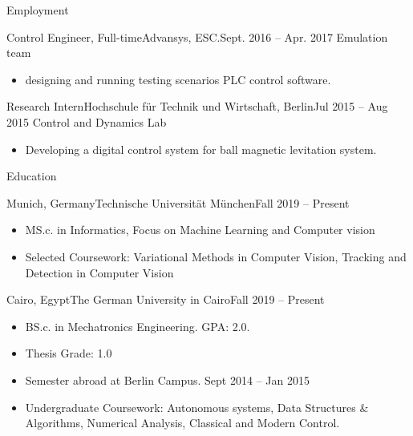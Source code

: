 \documentclass[]{mcdowellcv}
\begin{document}
\begin{cvsection}{Employment}
		\begin{cvsubsection}{Control Engineer, Full-time}{Advansys, ESC.}{Sept. 2016 -- Apr. 2017}
			Emulation team
			\begin{itemize}
				\item designing and running testing scenarios PLC control software.
			\end{itemize}
		\end{cvsubsection}
		
		\begin{cvsubsection}{Research Intern}{Hochschule für Technik und Wirtschaft, Berlin}{Jul 2015 -- Aug 2015}
			Control and Dynamics Lab		
			\begin{itemize}
				\item Developing a digital control system for ball magnetic levitation system.
			\end{itemize}
		\end{cvsubsection}
		
	\end{cvsection}
	
	\begin{cvsection}{Education}
		\begin{cvsubsection}{Munich, Germany}{Technische Universität München}{Fall 2019 -- Present}
			\begin{itemize}
				\item MS.c. in Informatics, Focus on Machine Learning and Computer vision
				\item Selected Coursework: Variational Methods in Computer Vision, Tracking and Detection in Computer Vision
			\end{itemize}
		\end{cvsubsection}
		\begin{cvsubsection}{Cairo, Egypt}{The German University in Cairo}{Fall 2019 -- Present}
			\begin{itemize}
				\item BS.c. in Mechatronics Engineering. GPA: 2.0.
				\item Thesis Grade: 1.0
				\item Semester abroad at Berlin Campus. Sept 2014 -- Jan 2015

				\item Undergraduate Coursework: Autonomous systems, Data Structures \& Algorithms, Numerical Analysis, Classical and Modern Control.
			\end{itemize}
		\end{cvsubsection}
	\end{cvsection}
	
\end{document}
